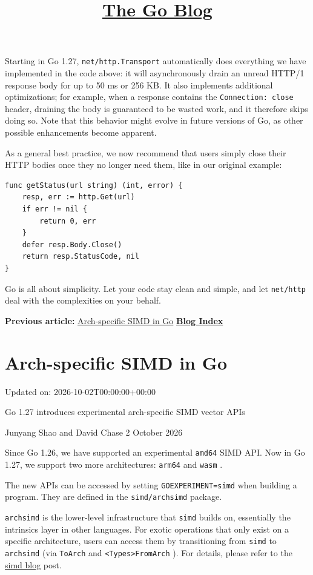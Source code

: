 \documentclass[11pt,a4paper]{article}
\begin{document}
Starting in Go 1.27, \texttt{net/http.Transport} automatically does everything we have implemented in the code above: it will asynchronously drain an unread HTTP/1 response body for up to 50 ms or 256 KB. It also implements additional optimizations; for example, when a response contains the \texttt{Connection: close} header, draining the body is guaranteed to be wasted work, and it therefore skips doing so. Note that this behavior might evolve in future versions of Go, as other possible enhancements become apparent.

As a general best practice, we now recommend that users simply close their HTTP bodies once they no longer need them, like in our original example:

\begin{verbatim}
func getStatus(url string) (int, error) {
    resp, err := http.Get(url)
    if err != nil {
        return 0, err
    }
    defer resp.Body.Close()
    return resp.StatusCode, nil
}
\end{verbatim}

Go is all about simplicity. Let your code stay clean and simple, and let \texttt{net/http} deal with the complexities on your behalf.

\textbf{Previous article:} \href{https://go.dev/blog/archsimd}{Arch-specific SIMD in Go} \href{https://go.dev/blog/all}{\textbf{Blog Index}}

\section{Arch-specific SIMD in Go}

Updated on: 2026-10-02T00:00:00+00:00

Go 1.27 introduces experimental arch-specific SIMD vector APIs

\title{\href{https://go.dev/blog/}{The Go Blog}}

Junyang Shao and David Chase
2 October 2026

Since Go 1.26, we have supported an experimental \texttt{amd64} SIMD API. Now in Go 1.27, we support two more architectures: \texttt{arm64} and \texttt{wasm} .

The new APIs can be accessed by setting \texttt{GOEXPERIMENT=simd} when building a program. They are defined in the \texttt{simd/archsimd} package.

\texttt{archsimd} is the lower-level infrastructure that \texttt{simd} builds on, essentially the intrinsics layer in other languages. For exotic operations that only exist on a specific architecture, users can access them by transitioning from \texttt{simd} to \texttt{archsimd} (via \texttt{ToArch} and \texttt{<Types>FromArch} ). For details, please refer to the \href{https://go.dev/blog/simd-experiment}{simd blog} post.
\end{document}
